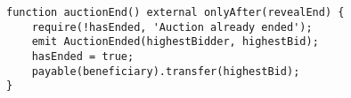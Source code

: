 \begin{lstlisting}[language=Solidity]
function auctionEnd() external onlyAfter(revealEnd) {
	require(!hasEnded, 'Auction already ended');
	emit AuctionEnded(highestBidder, highestBid);
	hasEnded = true;
	payable(beneficiary).transfer(highestBid);
}
\end{lstlisting}